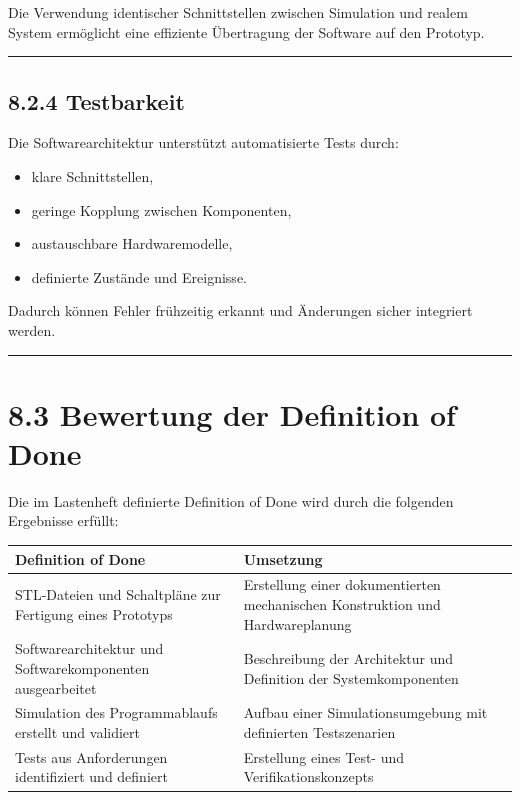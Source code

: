 \documentclass[
  a4paper,
  12pt,
  DIV=12,        %
  parskip=half,  %
  headings=small %
]{scrartcl}
\theoremstyle{definition}
\providecommand{\tightlist}{%
  \setlength{\itemsep}{0pt}\setlength{\parskip}{0pt}}
\theoremstyle{definition}
\providecommand{\tightlist}{%
  \setlength{\itemsep}{0pt}\setlength{\parskip}{0pt}}
\begin{document}
Die Verwendung identischer Schnittstellen zwischen Simulation und realem
System ermöglicht eine effiziente Übertragung der Software auf den
Prototyp.

\begin{center}\rule{0.5\linewidth}{0.5pt}\end{center}

\subsection{8.2.4 Testbarkeit}\label{testbarkeit}

Die Softwarearchitektur unterstützt automatisierte Tests durch:

\begin{itemize}
\tightlist
\item
  klare Schnittstellen,
\item
  geringe Kopplung zwischen Komponenten,
\item
  austauschbare Hardwaremodelle,
\item
  definierte Zustände und Ereignisse.
\end{itemize}

Dadurch können Fehler frühzeitig erkannt und Änderungen sicher
integriert werden.

\begin{center}\rule{0.5\linewidth}{0.5pt}\end{center}

\section{8.3 Bewertung der Definition of
Done}\label{bewertung-der-definition-of-done}

Die im Lastenheft definierte Definition of Done wird durch die folgenden
Ergebnisse erfüllt:

\begin{longtable}[]{@{}
  >{\raggedright\arraybackslash}p{}
  >{\raggedright\arraybackslash}p{}@{}}
\toprule\noalign{}
\begin{minipage}[b]{\linewidth}\raggedright
Definition of Done
\end{minipage} & \begin{minipage}[b]{\linewidth}\raggedright
Umsetzung
\end{minipage} \\
\midrule\noalign{}
\endhead
\bottomrule\noalign{}
\endlastfoot
STL-Dateien und Schaltpläne zur Fertigung eines Prototyps & Erstellung
einer dokumentierten mechanischen Konstruktion und Hardwareplanung \\
Softwarearchitektur und Softwarekomponenten ausgearbeitet & Beschreibung
der Architektur und Definition der Systemkomponenten \\
Simulation des Programmablaufs erstellt und validiert & Aufbau einer
Simulationsumgebung mit definierten Testszenarien \\
Tests aus Anforderungen identifiziert und definiert & Erstellung eines
Test- und Verifikationskonzepts \\
\end{longtable}
\end{document}
